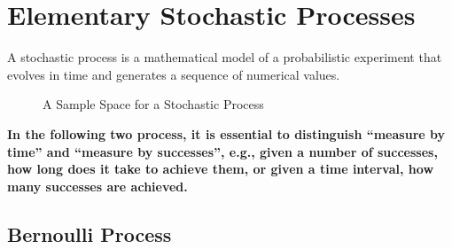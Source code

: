 \chapter{Elementary Stochastic Processes}

\begin{definition}
    A stochastic process is a mathematical model of a probabilistic experiment that evolves in time and generates a sequence of numerical values.
\end{definition}

\begin{figure}[H]
    \centering
    \resizebox{!}{0.3\linewidth}
    {}
    \caption{A Sample Space for a Stochastic Process}
\end{figure}

\begin{remark}
    \textbf{In the following two process, it is essential to distinguish ``measure by time'' and ``measure by successes'', e.g., given a number of successes, how long does it take to achieve them, or given a time interval, how many successes are achieved.}
\end{remark}

\section{Bernoulli Process}

